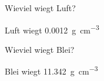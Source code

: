 \documentclass[addpoints,12pt,ngerman,answers]{exam}
\begin{document}
\begin{questions}
\question[5]
Wieviel wiegt Luft?

\begin{solution}
Luft wiegt \SI{0,0012}{\gram\per \centi\meter^3} 
\end{solution}

\question[5]
Wieviel wiegt Blei?

\begin{solution}
Blei wiegt \SI{11,342}{\gram\per \centi\meter^3} 
\end{solution}

\end{questions}

\gradetable[h][pages]
\end{document}
